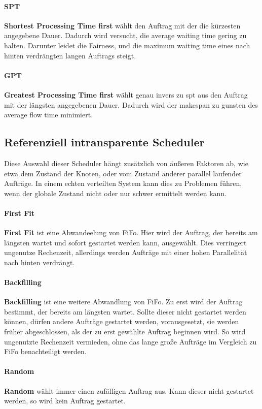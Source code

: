 \paragraph{SPT}
\textbf{Shortest Processing Time first} wählt den Auftrag mit der die kürzesten angegebene Dauer. Dadurch wird versucht, die average waiting time gering zu halten. Darunter leidet die Fairness, und die maximum waiting time eines nach hinten verdrängten langen Auftrags steigt.

\paragraph{GPT}
\textbf{Greatest Processing Time first} wählt genau invers zu spt aus den Auftrag mit der längsten angegebenen Dauer. Dadurch wird der makespan zu gunsten des average flow time minimiert.

\subsection{Referenziell intransparente Scheduler}
Diese Auswahl dieser Scheduler hängt zusätzlich von äußeren Faktoren ab, wie etwa dem Zustand der Knoten, oder vom Zustand anderer parallel laufender Aufträge. In einem echten verteilten System kann dies zu Problemen führen, wenn der globale Zustand nicht oder nur schwer ermittelt werden kann.

\paragraph{First Fit}
\textbf{First Fit} ist eine Abwandeelung von FiFo. Hier wird  der Auftrag, der bereits am längsten wartet und sofort gestartet werden kann, ausgewählt. Dies verringert ungenutze Rechenzeit, allerdings werden Aufträge mit einer hohen Parallelität nach hinten verdrängt.

\paragraph{Backfilling}
\textbf{Backfilling} ist eine weitere Abwandlung von FiFo. Zu erst wird der Auftrag bestimmt, der bereits am längsten wartet. Sollte dieser nicht gestartet werden können, dürfen andere Aufträge gestartet werden, vorausgesetzt, sie werden früher abgeschlossen, als der zu erst gewählte Auftrag beginnen wird. So wird ungenutzte Rechenzeit vermieden, ohne das lange große Aufträge im Vergleich zu FiFo benachteiligt werden.

\paragraph{Random}
\textbf{Random} wählt immer einen zufälligen Auftrag aus. Kann dieser nicht gestartet werden, so wird kein Auftrag gestartet.

